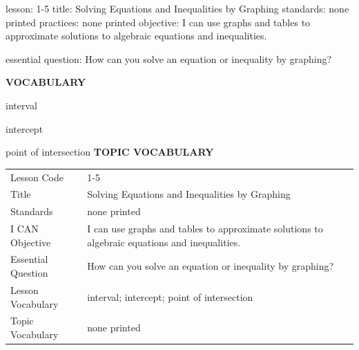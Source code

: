 \documentclass{article}
\newenvironment{lesson-meta}{}{}        %
\newcommand{\te}[1]{}                   %
\begin{document}
\begin{lesson-meta}
lesson: 1-5
title: Solving Equations and Inequalities by Graphing
standards: none printed
practices: none printed
objective: I can use graphs and tables to approximate solutions to algebraic equations and inequalities.

essential question: How can you solve an equation or inequality by graphing?

\textbf{VOCABULARY}
\item interval
\item intercept
\item point of intersection
\textbf{TOPIC VOCABULARY}
\te{No topic vocabulary list or numbered standard/practice codes is printed. Listed vocabulary is review vocabulary. Objective and Essential Question are from PDF pages 64-65.}
\begin{tabular}{ll}
Lesson Code & 1-5 \\
Title & Solving Equations and Inequalities by Graphing \\
Standards & none printed \\
I CAN Objective & I can use graphs and tables to approximate solutions to algebraic equations and inequalities. \\
Essential Question & How can you solve an equation or inequality by graphing? \\
Lesson Vocabulary & interval; intercept; point of intersection \\
Topic Vocabulary & none printed \\
\end{tabular}
\end{lesson-meta}
\end{document}
